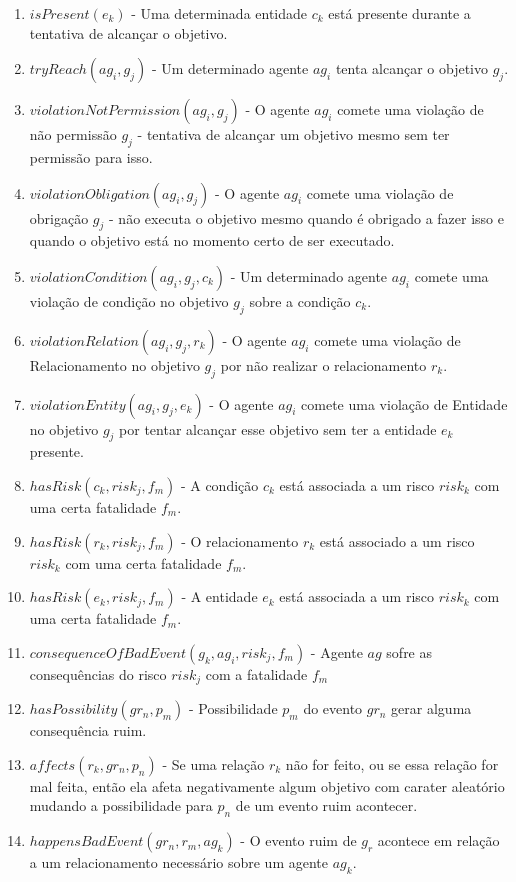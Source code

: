 \documentclass[12pt]{article}
\begin{document}
\begin{enumerate}
	\item $isPresent(e_k)$ - Uma determinada entidade $c_k$ está presente durante a tentativa de alcançar o objetivo.		
	\item $tryReach(ag_i,g_j)$ - Um determinado agente $ag_i$ tenta alcançar o objetivo $g_j$.
	\item $violationNotPermission(ag_i,g_j)$ - O agente $ag_i$ comete uma violação de não permissão $g_j$ - tentativa de alcançar um objetivo mesmo sem ter permissão para isso. 	
	\item $violationObligation(ag_i,g_j)$ - O agente $ag_i$ comete uma violação de obrigação $g_j$ - não executa o objetivo mesmo quando é obrigado a fazer isso e quando o objetivo está no momento certo de ser executado.
	\item $violationCondition(ag_i,g_j,c_k)$ - Um determinado agente $ag_i$ comete uma violação de condição no objetivo $g_j$ sobre a condição $c_k$. 
	\item $violationRelation(ag_i,g_j,r_k)$ - O agente $ag_i$ comete uma violação de Relacionamento no objetivo $g_j$ por não realizar o relacionamento $r_k$. 
	\item $violationEntity(ag_i,g_j,e_k)$ - O agente $ag_i$ comete uma violação de Entidade no objetivo $g_j$ por tentar alcançar esse objetivo sem ter a entidade $e_k$ presente.  	
	\item $hasRisk(c_k,risk_j,f_m)$ - A condição $c_k$ está associada a um risco $risk_k$ com uma certa fatalidade $f_m$. 
	\item $hasRisk(r_k,risk_j,f_m)$ - O relacionamento $r_k$ está associado a um risco $risk_k$ com uma certa fatalidade $f_m$.
	\item $hasRisk(e_k,risk_j,f_m)$ - A entidade $e_k$ está associada a um risco $risk_k$ com uma certa fatalidade $f_m$.
	\item $consequenceOfBadEvent(g_k,ag_i,risk_j,f_m)$ - Agente $ag$ sofre as consequências do risco $risk_j$ com a fatalidade $f_m$
	\item $hasPossibility(gr_n,p_m)$ - Possibilidade $p_m$ do evento $gr_n$ gerar alguma consequência ruim. 	
	\item $affects(r_k,gr_n,p_n)$ - Se uma relação $r_k$ não for feito, ou se essa relação for mal feita, então ela afeta negativamente algum objetivo com carater aleatório mudando a possibilidade para $p_n$ de um evento ruim acontecer. 	
	\item $happensBadEvent(gr_n,r_m,ag_k)$ - O evento ruim de $g_r$ acontece em relação a um relacionamento necessário sobre um agente $ag_k$. 		
\end{enumerate}
\end{document}
